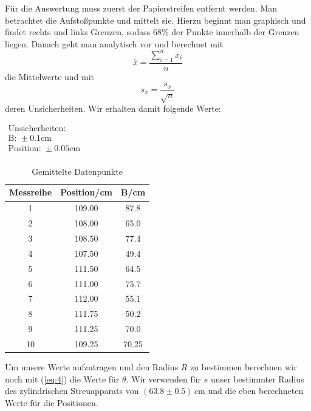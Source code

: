 \documentclass[11pt,a4paper]{article}
\begin{document}
F\"ur die Auswertung muss zuerst der Papierstreifen entfernt werden. Man betrachtet die Aufsto\ss punkte und mittelt sie. Hierzu beginnt man graphisch und findet rechts und links Grenzen, sodass 68\% der Punkte innerhalb der Grenzen liegen. Danach geht man analytisch vor und berechnet mit
\begin{equation}
\bar{x}=\frac{\sum_{i=1}^n x_i}{n}\label{mean}
\end{equation}
die Mittelwerte und mit
\begin{equation}
s_{\bar{x}}=\frac{{s_x}}{\sqrt{n}}\label{meanstd}
\end{equation}
deren Unsicherheiten. Wir erhalten damit folgende Werte:

\begin{table}[h]
\centering
\caption{Gemittelte Datenpunkte} \vspace{11pt}
$\begin{array}{l}
\textrm{Unsicherheiten:}\\
\textrm{B: } \pm 0.1 \textrm{cm}\\
\textrm{Position: } \pm 0.05 \textrm{cm}\\
\end{array}$
\begin{tabular}{ccc}
\toprule
\textrm{Messreihe} & \textrm{Position}/\textrm{cm} & \textrm{B}/\textrm{cm} \\
\midrule 
1 & 109.00 & 87.8 \\
2 & 108.00 & 65.0 \\
3 & 108.50 & 77.4 \\
4 & 107.50 & 49.4\\
5 & 111.50 & 64.5 \\
6 & 111.00 & 75.7\\
7 & 112.00 & 55.1 \\
8 & 111.75 & 50.2 \\
9 & 111.25 & 70.0 \\
10 & 109.25 & 70.25 \\ 
\bottomrule
\end{tabular}
\label{Tab:1}
\end{table}

Um unsere Werte aufzutragen und den Radius $R$ zu bestimmen berechnen wir noch mit (\ref{eq:4}) die Werte f\"ur $\theta$. Wir verwenden f\"ur $s$ unser bestimmter Radius des zylindrischen Streuapparats von $(63.8\pm0.5)$\,cm und die eben berechneten Werte f\"ur die Positionen.
\end{document}
